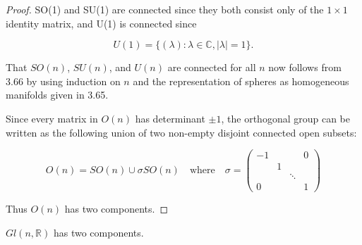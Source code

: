 \begin{proof}
SO(1) and SU(1) are connected since they both consist only of the  $ 1 \times 1 $ identity matrix, and U(1) is connected since

\[
U(1)=\{(\lambda)\colon\lambda\in\mathbb{C},|\lambda|=1\}.
\]

That $SO(n)$, $SU(n)$, and $U(n)$ are connected for all $n$ now follows from 3.66 by using induction on $n$ and the representation of spheres as homogeneous manifolds given in 3.65.

Since every matrix in $O(n)$ has determinant $\pm1$, the orthogonal group can be written as the following union of two non-empty disjoint connected open subsets:

\[
O(n)=SO(n)\cup\sigma SO(n)\quad\mathrm{where}\quad\sigma=\begin{pmatrix} -1 & & & 0\\ & 1 & & \\ & & \ddots & \\ 0 & & & 1\end{pmatrix}
\]

Thus $O(n)$ has two components.

\end{proof}

\begin{theorem}\label{thm:3.68}
$ Gl(n,\mathbb{R}) $ has two components.

\end{theorem}

